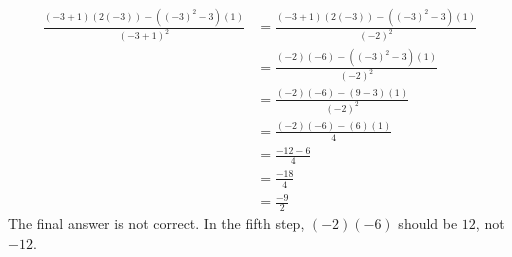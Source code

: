 {\begin{equation*}
	\begin{split}
		\frac{(-3+1)(2(-3))-((-3)^2-3)(1)}{(-3+1)^2} & = \frac{(-3+1)(2(-3)) - ((-3)^2-3)(1)}{(-2)^2} \\
							     & = \frac{(-2)(-6)-((-3)^2-3)(1)}{(-2)^2} \\
							     & = \frac{(-2)(-6) -(9-3)(1)}{(-2)^2} \\
							     & = \frac{(-2)(-6) -(6)(1)}{4} \\
							     & = \frac{-12-6}{4} \\
							     & = \frac{-18}{4} \\
							     & = \frac{-9}{2}
	\end{split}
\end{equation*} 
\vfill\break}
{The final answer is not correct. In the fifth step, $(-2)(-6)$ should be $12$, not $-12$.}

